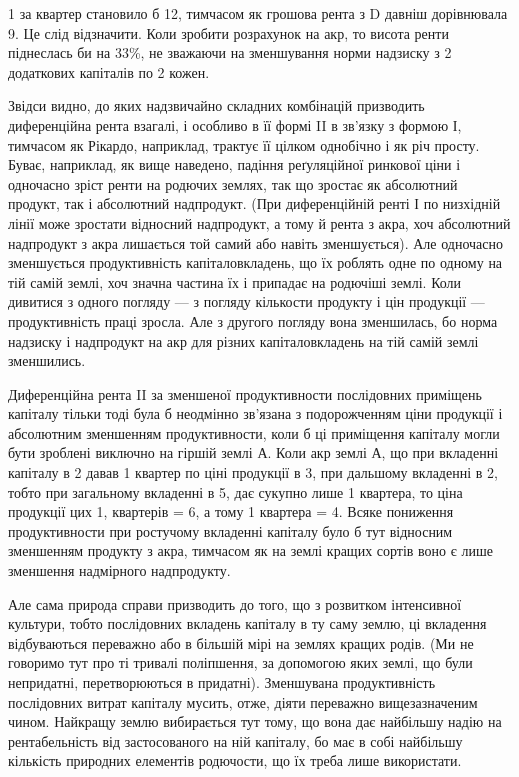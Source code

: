 \parcont{}  %
1 за квартер становило б 12, тимчасом як грошова рента
з D давніш дорівнювала 9. Це слід відзначити. Коли зробити розрахунок
на акр, то висота ренти піднеслась би на 33\%, не зважаючи на зменшування
норми надзиску з 2 додаткових капіталів по 2 кожен.

Звідси видно, до яких надзвичайно складних комбінацій призводить диференційна
рента взагалі, і особливо в її формі II в зв’язку з формою І, тимчасом
як Рікардо, наприклад, трактує її цілком однобічно і як річ просту. Буває, наприклад,
як вище наведено, падіння реґуляційної ринкової ціни і одночасно зріст
ренти на родючих землях, так що зростає як абсолютний продукт, так і
абсолютний надпродукт. (При диференційній ренті І по низхідній лінії може
зростати відносний надпродукт, а тому й рента з акра, хоч абсолютний надпродукт
з акра лишається той самий або навіть зменшується). Але одночасно
зменшується продуктивність капіталовкладень, що їх роблять одне по одному
на тій самій землі, хоч значна частина їх і припадає на родючіші землі. Коли
дивитися з одного погляду — з погляду кількости продукту і цін продукції —
продуктивність праці зросла. Але з другого погляду вона зменшилась, бо норма
надзиску і надпродукт на акр для різних капіталовкладень на тій самій землі
зменшились.

Диференційна рента II за зменшеної продуктивности послідовних приміщень
капіталу тільки тоді була б неодмінно зв’язана з подорожченням ціни продукції
і абсолютним зменшенням продуктивности, коли б ці приміщення капіталу
могли бути зроблені виключно на гіршій землі А. Коли акр землі А, що
при вкладенні капіталу в 2 давав 1 квартер по ціні продукції
в 3, при дальшому вкладенні в 2, тобто при загальному
вкладенні в 5, дає сукупно лише 1 квартера, то ціна продукції цих
1, квартерів = 6, а тому 1 квартера = 4. Всяке пониження
продуктивности при ростучому вкладенні капіталу було б тут відносним зменшенням
продукту з акра, тимчасом як на землі кращих сортів воно є лише
зменшення надмірного надпродукту.

Але сама природа справи призводить до того, що з розвитком інтенсивної
культури, тобто послідовних вкладень капіталу в ту саму землю, ці вкладення
відбуваються переважно або в більшій мірі на землях кращих родів. (Ми не говоримо
тут про ті тривалі поліпшення, за допомогою яких землі, що були непридатні,
перетворюються в придатні). Зменшувана продуктивність послідовних
витрат капіталу мусить, отже, діяти переважно вищезазначеним чином. Найкращу
землю вибирається тут тому, що вона дає найбільшу надію на рентабельність
від застосованого на ній капіталу, бо має в собі найбільшу кількість природних
елементів родючости, що їх треба лише використати.

